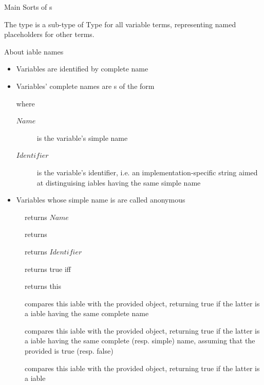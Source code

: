 \documentclass[handout]{beamer}
\begin{document}
\begin{frame}[allowframebreaks]{Main Sorts of s}
    \framebreak

    \begin{block}{The  type is a sub-type of }\centering
        Type for all variable terms, representing \alert{named} placeholders for other terms.
    \end{block}
    \begin{alertblock}{About iable names}
        \begin{itemize}
            \item Variables are identified by \alert{complete name}
            \item Variables' complete names are s of the form
            \begin{center}
            \end{center}
            where
            \begin{description}
                \item[$Name$] is the variable's \alert{simple} name
                \item[$Identifier$] is the variable's \alert{identifier}, i.e. an im\-ple\-men\-ta\-tion-spe\-ci\-fic string aimed at distinguising iables having the same simple name
            \end{description}
            \item Variables whose simple name is  are called \alert{anonymous}
        \end{itemize}
    \end{alertblock}
    \begin{description}
        \item[] returns $Name$
        \item[] returns 
        \item[] returns $Identifier$
        \item[] returns true iff 
        \item[] returns this 
        \item[] compares this iable with the provided object, returning true if the latter is a iable having the same complete name
        \item[] compares this iable with the provided object, returning true if the latter is a iable having the same complete (resp. simple) name, assuming that the provided  is true (resp. false)
        \item[] compares this iable with the provided object, returning true if the latter is a iable
    \end{description}


\end{frame}
\end{document}
